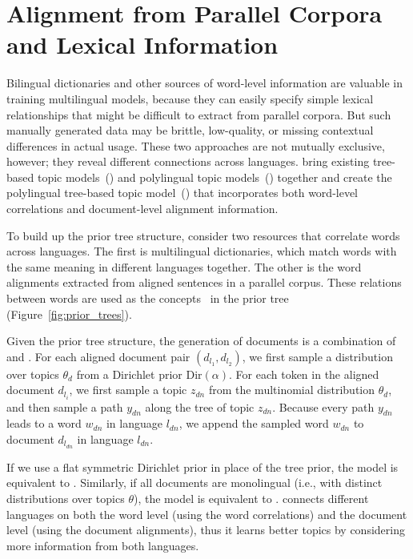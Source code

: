 
\section{Alignment from Parallel Corpora and Lexical Information}

Bilingual dictionaries and other sources of word-level information are 
valuable in training multilingual models, because they can easily specify 
simple lexical relationships that might be difficult to extract from parallel corpora.
But such manually generated data may be brittle, low-quality, or missing contextual differences in actual usage.
These two approaches are not mutually exclusive, however; they reveal
different connections across languages. \citet{hu-14} bring existing
tree-based topic models~(\tlda{}) and polylingual topic
models~(\plda{}) together and create the polylingual tree-based topic
model~(\ptlda{}) that incorporates both word-level correlations and
document-level alignment information.

To build up the prior tree structure, \citet{hu-14} consider two
resources that correlate words across languages. The first is
multilingual dictionaries, which match words with the same meaning in
different languages together. The other is the word alignments
extracted from aligned sentences in a parallel corpus. These relations
between words are used as the concepts~\citep{Bhattacharya-2006} in
the prior tree (Figure~\ref{fig:prior_trees}).

Given the prior tree structure, the generation of documents is a
combination of \tlda{} and \plda{}.  For each aligned document pair
$(d_{l_1}, d_{l_2})$, we first sample a distribution over topics
$\theta_d$ from a Dirichlet prior $\text{Dir}(\alpha)$.  For each
token in the aligned document $d_{l_i}$, we first sample a topic
$z_{dn}$ from the multinomial distribution $\theta_d$, and then sample
a path $y_{dn}$ along the tree of topic $z_{dn}$. Because every path
$y_{dn}$ leads to a word $w_{dn}$ in language $l_{dn}$, we append the
sampled word $w_{dn}$ to document $d_{l_{dn}}$ in language $l_{dn}$.

If we use a flat symmetric Dirichlet prior in place of the tree prior,
the model is equivalent to \plda{}. Similarly, if all documents are monolingual (i.e., with
distinct distributions over topics $\theta$), the model is equivalent to \tlda{}. \ptlda{} connects different languages on both the word
level (using the word correlations) and the document level (using the
document alignments), thus it learns better topics by considering more
information from both languages.


